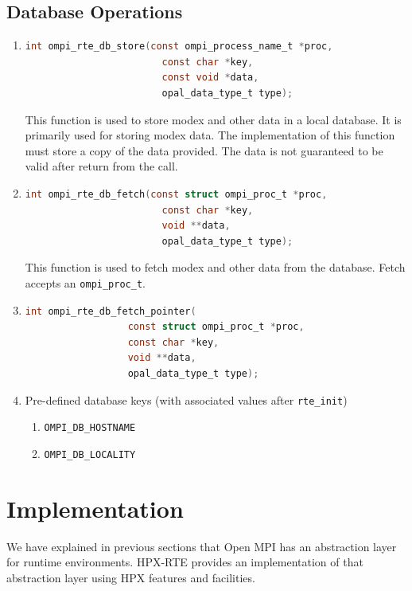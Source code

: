 \subsection{Database Operations}
\begin{enumerate}
\item
  \begin{lstlisting}[language=C]
  int ompi_rte_db_store(const ompi_process_name_t *proc,
                        const char *key,
                        const void *data,
                        opal_data_type_t type);
  \end{lstlisting}
  This function is used to store modex and other data in a local database. It is primarily used for storing modex data. The implementation of this function must store a copy of the data provided. The data is not guaranteed to be valid after return from the call.

\item
  \begin{lstlisting}[language=C]
  int ompi_rte_db_fetch(const struct ompi_proc_t *proc,
                        const char *key,
                        void **data,
                        opal_data_type_t type);
  \end{lstlisting}
  This function is used to fetch modex and other data from the database. Fetch accepts an \verb|ompi_proc_t|.

\item
  \begin{lstlisting}[language=C]
  int ompi_rte_db_fetch_pointer(
                  const struct ompi_proc_t *proc,
                  const char *key,
                  void **data,
                  opal_data_type_t type);  
  \end{lstlisting}
    
\item Pre-defined database keys (with associated values after \verb|rte_init|)
  \begin{enumerate}
    \item \verb|OMPI_DB_HOSTNAME|
    \item \verb|OMPI_DB_LOCALITY|
  \end{enumerate}
\end{enumerate}



\section{Implementation}
\label{sec:implementation}
We have explained in previous sections that Open MPI has an abstraction layer for runtime environments. HPX-RTE provides an implementation of that abstraction layer using HPX features and facilities.


